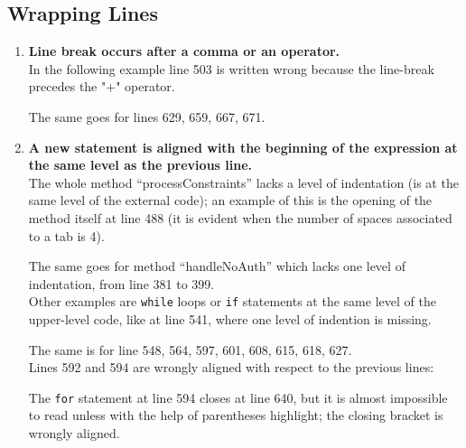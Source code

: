 \documentclass[a4paper,11pt]{report} %
\begin{document}
		\subsection*{Wrapping Lines}\begin{enumerate}[resume]
			\item \textbf{Line break occurs after a comma or an operator.}\smallskip \\
				In the following example line 503 is written wrong because the line-break precedes the "+" operator.
				
				The same goes for lines 629, 659, 667, 671.
			\setcounter{enumi}{16}
			\item \textbf{A new statement is aligned with the beginning of the expression at the same level as the previous line.}\smallskip \\
				The whole method ``processConstraints'' lacks a level of indentation (is at the same level of the external code); an example of this is the opening of the method itself at line 488 (it is evident when the number of spaces associated to a tab is 4).
				
				The same goes for method ``handleNoAuth'' which lacks one level of indentation, from line 381 to 399.\\
				Other examples are \texttt{while} loops or \texttt{if} statements at the same level of the upper-level code, like at line 541, where one level of indention is missing.
				
				The same is for line 548, 564, 597, 601, 608, 615, 618, 627.\\
				Lines 592 and 594 are wrongly aligned with respect to the previous lines:
				
				The \texttt{for} statement at line 594 closes at line 640, but it is almost impossible to read unless with the help of parentheses highlight; the closing bracket is wrongly aligned.
		\end{enumerate}
		
\end{document}
